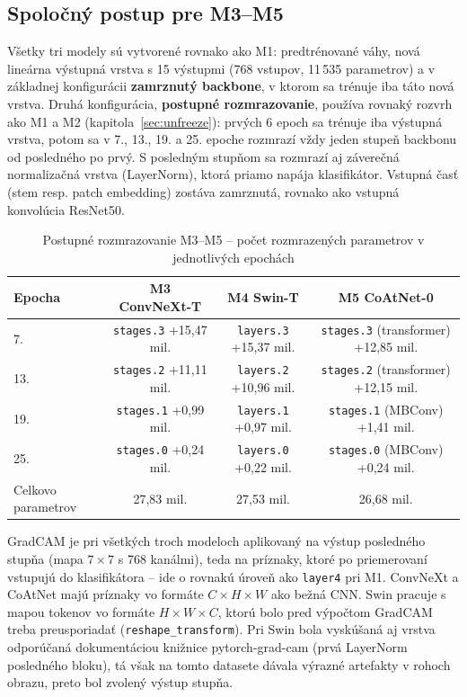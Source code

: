 \subsection{Spoločný postup pre M3--M5}
\label{sec:m345-postup}

Všetky tri modely sú vytvorené rovnako ako M1: predtrénované váhy, nová
lineárna výstupná vrstva s 15 výstupmi (768 vstupov, 11\,535 parametrov)
a v základnej konfigurácii \textbf{zamrznutý backbone}, v ktorom sa trénuje
iba táto nová vrstva. Druhá konfigurácia, \textbf{postupné rozmrazovanie},
používa rovnaký rozvrh ako M1 a M2 (kapitola~\ref{sec:unfreeze}): prvých
6 epoch sa trénuje iba výstupná vrstva, potom sa v 7., 13., 19. a 25. epoche
rozmrazí vždy jeden stupeň backbonu od posledného po prvý. S posledným
stupňom sa rozmrazí aj záverečná normalizačná vrstva (LayerNorm), ktorá
priamo napája klasifikátor. Vstupná časť (stem resp. patch embedding)
zostáva zamrznutá, rovnako ako vstupná konvolúcia ResNet50.

\begin{table}[H]
    \centering
    \caption{Postupné rozmrazovanie M3--M5 -- počet rozmrazených parametrov v jednotlivých epochách}
    \label{tab:m345-unfreeze}
    \footnotesize
    \begin{tabular}{lccc}
        \toprule
        Epocha & M3 ConvNeXt-T & M4 Swin-T & M5 CoAtNet-0 \\
        \midrule
        7.  & \texttt{stages.3} +15,47 mil. & \texttt{layers.3} +15,37 mil. & \texttt{stages.3} (transformer) +12,85 mil. \\
        13. & \texttt{stages.2} +11,11 mil. & \texttt{layers.2} +10,96 mil. & \texttt{stages.2} (transformer) +12,15 mil. \\
        19. & \texttt{stages.1} +0,99 mil.  & \texttt{layers.1} +0,97 mil.  & \texttt{stages.1} (MBConv) +1,41 mil. \\
        25. & \texttt{stages.0} +0,24 mil.  & \texttt{layers.0} +0,22 mil.  & \texttt{stages.0} (MBConv) +0,24 mil. \\
        \midrule
        Celkovo parametrov & 27,83 mil. & 27,53 mil. & 26,68 mil. \\
        \bottomrule
    \end{tabular}
\end{table}

GradCAM je pri všetkých troch modeloch aplikovaný na výstup posledného
stupňa (mapa $7\times7$ s 768 kanálmi), teda na príznaky, ktoré po
priemerovaní vstupujú do klasifikátora -- ide o rovnakú úroveň ako
\texttt{layer4} pri M1. ConvNeXt a CoAtNet majú príznaky vo formáte
$C\times H\times W$ ako bežná CNN. Swin pracuje s mapou tokenov vo formáte
$H\times W\times C$, ktorú bolo pred výpočtom GradCAM treba preusporiadať
(\texttt{reshape\_transform}). Pri Swin bola vyskúšaná aj vrstva odporúčaná
dokumentáciou knižnice pytorch-grad-cam (prvá LayerNorm posledného bloku),
tá však na tomto datasete dávala výrazné artefakty v rohoch obrazu, preto
bol zvolený výstup stupňa.

